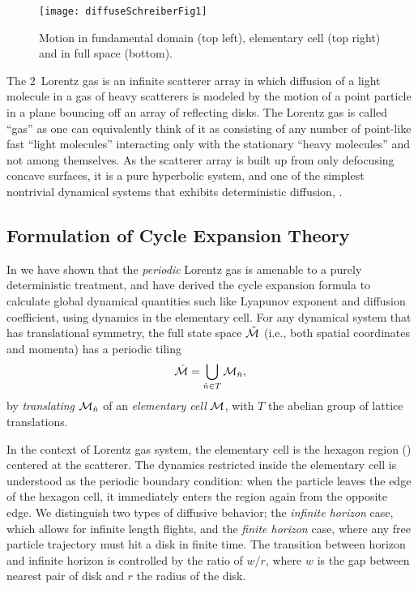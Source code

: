 \documentclass[aps,pre,preprint,groupedaddress,floatfix]{revtex4-1}
\begin{document}
\begin{figure}[htbp]
\begin{center}
\texttt{[image: diffuseSchreiberFig1]}
\end{center}
\caption[]{\label{fig-schrieberFig1}Motion in fundamental domain (top left), elementary cell (top right) and in full space (bottom).}

\end{figure}

The $2$\dmn\ Lorentz gas is an infinite scatterer array in which diffusion of a light molecule in a gas of heavy scatterers is modeled by the motion of a point particle in a plane bouncing off an array of reflecting disks. The Lorentz gas is called ``gas'' as one can equivalently think of it as consisting of any number of point-like fast ``light molecules'' interacting only with the stationary ``heavy molecules'' and not among themselves.  As the scatterer array is built up from only defocusing concave surfaces, it is a pure hyperbolic system, and one of the simplest nontrivial dynamical systems that exhibits deterministic diffusion, .

\subsection{Formulation of Cycle Expansion Theory}
In  we have shown that the {\em  periodic} Lorentz  gas is amenable to a purely deterministic treatment, and have derived the cycle expansion formula to calculate global dynamical quantities such like Lyapunov exponent and diffusion coefficient, using dynamics in the elementary cell. For any dynamical system that has translational symmetry, the full state space $\hat {{\cal M}}$ (i.e., both spatial coordinates and momenta) has a periodic tiling \[\hat {{\cal M}}=\bigcup_{ \hat n \in T} {\cal M}_{\hat n},\] by {\em translating} ${\cal M}_{\hat n}$ of an {\em elementary cell} ${\cal M}$, with $T$ the abelian group of lattice translations. 

In the context of Lorentz gas system, the elementary cell is the hexagon region () centered at the scatterer. The dynamics restricted inside the elementary cell is understood as the periodic boundary condition: when the particle leaves the edge of the hexagon cell, it immediately enters the region again from the opposite edge. We distinguish two types of diffusive behavior; the {\em infinite horizon} case, which allows for infinite length flights, and the {\em finite horizon} case, where any free particle trajectory must hit a disk in finite time. The transition between horizon and infinite horizon is controlled by the ratio of $w/r$, where $w$ is the gap between nearest pair of disk and $r$ the radius of the disk.   
\end{document}
